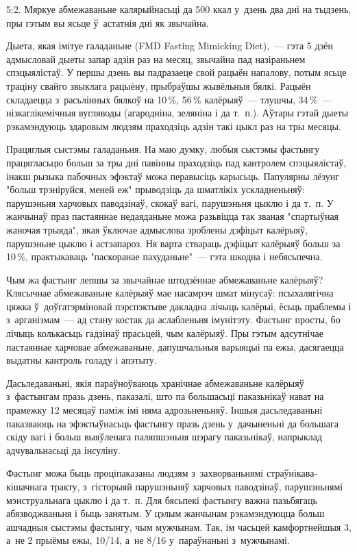 5:2. Мяркуе абмежаваньне калярыйнасьці да 500 ккал у~дзень два дні на тыдзень, пры гэтым вы ясьце ў~астатнія дні як звычайна.

Дыета, якая імітуе галаданьне (FMD Fasting Mimicking Diet),~--- гэта 5 дзён адмысловай дыеты запар адзін раз на месяц, звычайна пад назіраньнем спэцыялістаў. У першы дзень вы падразаеце свой рацыён напалову, потым ясьце траціну свайго звыклага рацыёну, прыбраўшы жывёльныя бялкі. Рацыён складаецца з~расьлінных бялкоў на 10\,\%, 56\,\% калёрыяў~--- тлушчы, 34\,\%~--- нізкаглікемічныя вугляводы (агародніна, зеляніна і да т.~п.). Аўтары гэтай дыеты рэкамэндуюць здаровым людзям праходзіць адзін такі цыкл раз на тры месяцы.

Працяглыя сыстэмы галаданьня. На маю думку, любыя сыстэмы фастынгу працягласьцю больш за тры дні павінны праходзіць пад кантролем спэцыялістаў, інакш рызыка пабочных эфэктаў можа перавысіць карысьць. Папулярны лёзунг "больш трэніруйся, меней еж" прыводзіць да шматлікіх ускладненьняў: парушэньня харчовых паводзінаў, скокаў вагі, парушэньня цыклю і да т.~п. У жанчынаў праз пастаяннае недаяданьне можа разьвіцца так званая "спартыўная жаночая трыяда", якая ўключае адмыслова зроблены дэфіцыт калёрыяў, парушэньне цыклю і астэапароз. Ня варта ствараць дэфіцыт калёрыяў больш за 10\,\%, практыкаваць "паскоранае пахуданьне"~--- гэта шкодна і небясьпечна.

Чым жа фастынг лепшы за звычайнае штодзённае абмежаваньне калёрыяў? Клясычнае абмежаваньне калёрыяў мае насамрэч шмат мінусаў: псыхалягічна цяжка ў~доўгатэрміновай пэрспэктыве дакладна лічыць калёрыі, ёсьць праблемы і з~арганізмам~--- ад стану костак да аслабленьня імунітэту. Фастынг просты, бо лічыць колькасьць гадзінаў прасьцей, чым калёрыяў. Пры гэтым адсутнічае пастаяннае харчовае абмежаваньне, дапушчальныя варыяцыі па ежы, дасягаецца выдатны кантроль голаду і апэтыту.

Дасьледаваньні, якія параўноўваюць хранічнае абмежаваньне калёрыяў з~фастынгам празь дзень, паказалі, што па большасьці паказьнікаў нават на прамежку 12 месяцаў паміж імі няма адрозьненьняў. Іншыя дасьледаваньні паказваюць на эфэктыўнасьць фастынгу празь дзень у~дачыненьні да большага скіду вагі і больш выяўленага паляпшэньня шэрагу паказьнікаў, напрыклад адчувальнасьці да інсуліну.

Фастынг можа быць проціпаказаны людзям з~захворваньнямі страўнікава-кішачнага тракту, з~гісторыяй парушэньняў харчовых паводзінаў, парушэньнямі мэнструальнага цыклю і да т.~п. Для бясьпекі фастынгу важна пазьбягаць абязводжваньня і быць занятым. У цэлым жанчынам рэкамэндуюцца больш ашчадныя сыстэмы фастынгу, чым мужчынам. Так, ім часьцей камфортнейшыя 3, а~не 2 прыёмы ежы, 10/14, а~не 8/16 у~параўнаньні з~мужчынамі.

